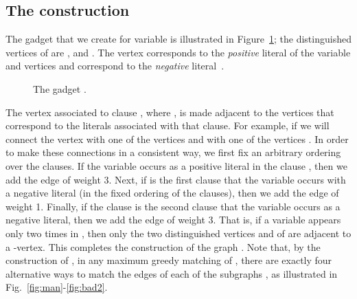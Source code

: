\documentclass[a4paper,11pt]{article}
\begin{document}
\subsection{The construction\label{construction-subsec}} 
The gadget  that we create for variable  is illustrated in 
Figure~\ref{fig:gx}; the distinguished vertices of  are 
,  and . 
The vertex  corresponds to the \emph{positive} literal of the 
variable and vertices  and  correspond to the 
\emph{negative} literal~. 
\begin{figure}[h!]
\label{fig:gx}
\begin{center}

\caption{The gadget .}
\end{center}
\end{figure} 


The vertex  associated to clause , where , is
made adjacent to the vertices that correspond to the literals associated
with that clause. For example, if  we
will connect the vertex  with one of the vertices  and with one of the vertices . In order to make these
connections in a consistent way, we first fix an arbitrary ordering over the
clauses. If the variable  occurs as a positive literal in the clause , then we add the edge  of weight 3. Next, if 
 is the first clause that the variable  occurs with a negative
literal (in the fixed ordering of the clauses), then we add the edge  of weight 1. Finally, if the clause  is the
second clause that the variable  occurs as a negative literal, then
we add the edge  of weight 3. That is, if a
variable  appears only two times in , then only the two
distinguished vertices  and  of  are adjacent to a -vertex. This completes the
construction of the graph . Note that, by the construction of , in any
maximum greedy matching of , there are exactly four alternative ways to
match the edges of each of the subgraphs , as
illustrated in Fig.~\ref{fig:man}-\ref{fig:bad2}.
\end{document}
